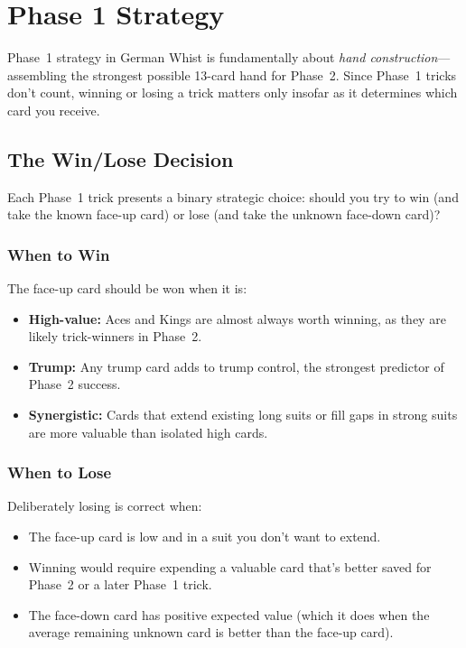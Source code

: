 \section{Phase 1 Strategy}
\label{sec:phase1}

Phase~1 strategy in German Whist is fundamentally about \emph{hand
construction}---assembling the strongest possible 13-card hand for Phase~2.
Since Phase~1 tricks don't count, winning or losing a trick matters only
insofar as it determines which card you receive.

\subsection{The Win/Lose Decision}

Each Phase~1 trick presents a binary strategic choice: should you try to win
(and take the known face-up card) or lose (and take the unknown face-down
card)?

\subsubsection{When to Win}

The face-up card should be won when it is:
\begin{itemize}
  \item \textbf{High-value:} Aces and Kings are almost always worth winning,
    as they are likely trick-winners in Phase~2.
  \item \textbf{Trump:} Any trump card adds to trump control, the strongest
    predictor of Phase~2 success.
  \item \textbf{Synergistic:} Cards that extend existing long suits or fill
    gaps in strong suits are more valuable than isolated high cards.
\end{itemize}

\subsubsection{When to Lose}

Deliberately losing is correct when:
\begin{itemize}
  \item The face-up card is low and in a suit you don't want to extend.
  \item Winning would require expending a valuable card that's better saved
    for Phase~2 or a later Phase~1 trick.
  \item The face-down card has positive expected value (which it does when
    the average remaining unknown card is better than the face-up card).
\end{itemize}

